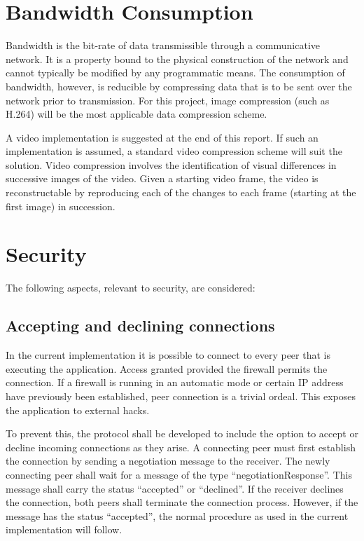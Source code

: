 \documentclass[10pt, a4paper]{article}
\title{\mytitle}
\author{
Benjamin Barann, bbarann, 708745 \and
Adam Juraszek, ajuraszek, 711466 \and
Jack Reardon, jackr, 643253
}
\begin{document}
\maketitle

\section{Bandwidth Consumption}

Bandwidth is the bit-rate of data transmissible through a communicative network. \cite{distributedsystems}
It is a property bound to the physical construction of the network and cannot typically be modified by any programmatic means.
The consumption of bandwidth, however, is reducible by compressing data that is to be sent over the network prior to transmission.
For this project, image compression (such as H.264) will be the most applicable data compression scheme.

A video implementation is suggested at the end of this report.
If such an implementation is assumed, a standard video compression scheme will suit the solution.
Video compression involves the identification of visual differences in successive images of the video.
Given a starting video frame, the video is reconstructable by reproducing each of the changes to each frame (starting at the first image) in succession.

\section{Security}

The following aspects, relevant to security, are considered:

\subsection{Accepting and declining connections}

In the current implementation it is possible to connect to every peer that is executing the application.
Access granted provided the firewall permits the connection.
If a firewall is running in an automatic mode or certain IP address have previously been established, peer connection is a trivial ordeal.
This exposes the application to external hacks.

To prevent this, the protocol shall be developed to include the option to accept or decline incoming connections as they arise.
A connecting peer must first establish the connection by sending a negotiation message to the receiver.
The newly connecting peer shall wait for a message of the type ``negotiationResponse''.
This message shall carry the status ``accepted'' or ``declined''.
If the receiver declines the connection, both peers shall terminate the connection process.
However, if the message has the status ``accepted'', the normal procedure as used in the current implementation will follow.
\end{document}

